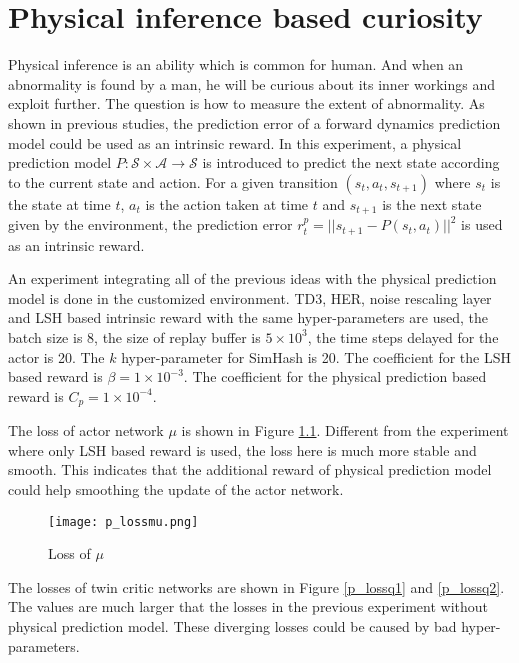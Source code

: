 \documentclass[a4paper, 12pt]{report}
\begin{document}
\chapter {Physical inference based curiosity}

Physical inference is an ability which is common for human. And when an abnormality is found by a man, he will be curious about its inner workings and exploit further. The question is how to measure the extent of abnormality. As shown in previous studies, the prediction error of a forward dynamics prediction model could be used as an intrinsic reward\cite{4141061}. In this experiment, a physical prediction model $P:\mathcal S\times \mathcal A\to \mathcal S$ is introduced to predict the next state according to the current state and action. For a given transition $(s_t,a_t,s_{t+1})$ where $s_t$ is the state at time $t$, $a_t$ is the action taken at time $t$ and $s_{t+1}$ is the next state given by the environment, the prediction error $r^p_t = ||s_{t+1} - P(s_t, a_t)||^2$ is used as an intrinsic reward.

An experiment integrating all of the previous ideas with the physical prediction model is done in the customized environment. TD3, HER, noise rescaling layer and LSH based intrinsic reward with the same hyper-parameters are used, the batch size is 8, the size of replay buffer is $5\times 10^3$, the time steps delayed for the actor is 20. The $k$ hyper-parameter for SimHash is 20. The coefficient for the LSH based reward is $\beta=1\times 10^{-3}$. The coefficient for the physical prediction based reward is $C_p=1\times 10^{-4}$.

The loss of actor network $\mu$ is shown in Figure \ref{p_lossmu}. Different from the experiment where only LSH based reward is used, the loss here is much more stable and smooth. This indicates that the additional reward of physical prediction model could help smoothing the update of the actor network.

        \begin{figure}[H]
        \centering
        \texttt{[image: p\_lossmu.png]}
        \caption{Loss of $\mu$}
            \label{p_lossmu}
        \end{figure}

The losses of twin critic networks are shown in Figure \ref{p_lossq1} and \ref{p_lossq2}. The values are much larger that the losses in the previous experiment without physical prediction model. These diverging losses could be caused by bad hyper-parameters.
\end{document}
